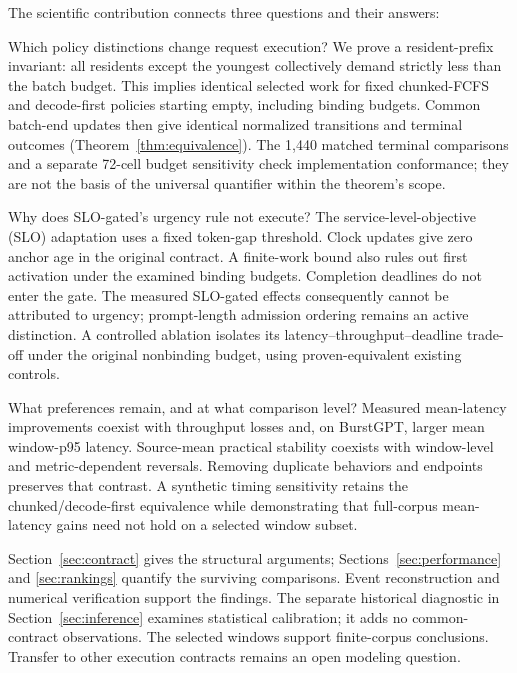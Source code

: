 The scientific contribution connects three questions and their answers:
\begin{description}[leftmargin=0pt,labelindent=0pt]
\item[RQ1: Effective behavior.] Which policy distinctions change request
execution? We prove a resident-prefix invariant: all residents except the
youngest collectively demand strictly less than the batch budget. This
implies identical selected work for fixed chunked-FCFS and decode-first
policies starting empty, including binding budgets. Common batch-end
updates then give identical normalized transitions and terminal outcomes
(Theorem~\ref{thm:equivalence}). The 1,440 matched terminal comparisons and
a separate 72-cell budget sensitivity check implementation conformance;
they are not the basis of the universal quantifier within the theorem's scope.
\item[RQ2: Mechanism inactivity.] Why does SLO-gated's urgency rule not
execute? The service-level-objective (SLO) adaptation uses a fixed token-gap
threshold. Clock updates give zero anchor age in the original contract. A
finite-work bound also rules out first activation under the examined binding
budgets. Completion deadlines do not enter the gate. The measured SLO-gated
effects consequently cannot be attributed to urgency; prompt-length
admission ordering remains an active distinction. A controlled ablation
isolates its latency--throughput--deadline trade-off under the original
nonbinding budget, using proven-equivalent existing controls.
\item[RQ3: Residual trade-offs and rankings.] What preferences remain, and
at what comparison level? Measured mean-latency improvements coexist with
throughput losses and, on BurstGPT, larger mean window-p95 latency.
Source-mean practical stability coexists with window-level and
metric-dependent reversals. Removing duplicate behaviors and endpoints
preserves that contrast. A synthetic timing sensitivity retains the
chunked/decode-first equivalence while demonstrating that full-corpus
mean-latency gains need not hold on a selected window subset.
\end{description}

Section~\ref{sec:contract} gives the structural arguments;
Sections~\ref{sec:performance} and \ref{sec:rankings} quantify the surviving
comparisons. Event reconstruction and numerical verification support the
findings. The separate historical diagnostic in Section~\ref{sec:inference}
examines statistical calibration; it adds no common-contract observations.
The selected windows support finite-corpus conclusions. Transfer to other
execution contracts remains an open modeling question.
